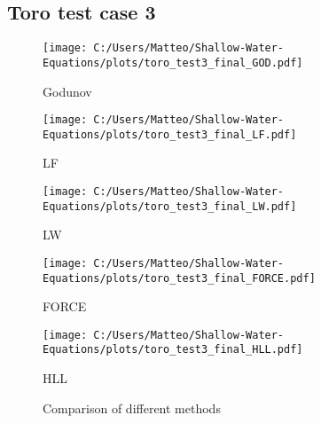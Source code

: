 \subsection{Toro test case 3}
\begin{figure}[H]
    \centering
    \begin{minipage}{0.45\textwidth}
        \centering
        \texttt{[image: C:/Users/Matteo/Shallow-Water-Equations/plots/toro\_test3\_final\_GOD.pdf]}
        \caption{Godunov}
    \end{minipage}%
    \hfill
    \begin{minipage}{0.45\textwidth}
        \centering
        \texttt{[image: C:/Users/Matteo/Shallow-Water-Equations/plots/toro\_test3\_final\_LF.pdf]}
        \caption{LF}
    \end{minipage}
    
    \vspace{0.5cm} %
    
    \begin{minipage}{0.45\textwidth}
        \centering
        \texttt{[image: C:/Users/Matteo/Shallow-Water-Equations/plots/toro\_test3\_final\_LW.pdf]}
        \caption{LW}
    \end{minipage}%
    \hfill
    \begin{minipage}{0.45\textwidth}
        \centering
        \texttt{[image: C:/Users/Matteo/Shallow-Water-Equations/plots/toro\_test3\_final\_FORCE.pdf]}
        \caption{FORCE}
    \end{minipage}

    \vspace{0.5cm} %
    
    \begin{minipage}{0.45\textwidth}
        \centering
        \texttt{[image: C:/Users/Matteo/Shallow-Water-Equations/plots/toro\_test3\_final\_HLL.pdf]}
        \caption{HLL}
    \end{minipage}
    \caption{Comparison of different methods}
\end{figure}






